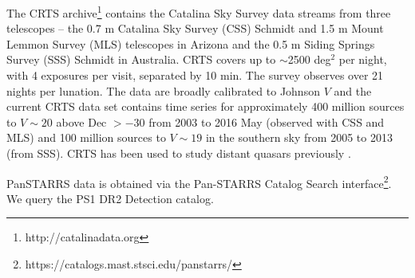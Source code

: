 \documentclass[fleqn,usenatbib]{mnras}
\begin{document}
The CRTS archive\footnote{http://catalinadata.org} contains the
Catalina Sky Survey data streams from three telescopes -- the 0.7 m
Catalina Sky Survey (CSS) Schmidt and 1.5 m Mount Lemmon Survey (MLS)
telescopes in Arizona and the 0.5 m Siding Springs Survey (SSS)
Schmidt in Australia. CRTS covers up to $\sim$2500 deg$^2$ per night,
with 4 exposures per visit, separated by 10 min. The survey observes
over 21 nights per lunation. The data are broadly calibrated to
Johnson $V$ \citep[see ][for details]{Drake2013} and the current CRTS
data set contains time series for approximately 400 million sources to
$V \sim 20$ above Dec $> -30$ from 2003 to 2016 May (observed with CSS
and MLS) and 100 million sources to $V \sim 19$ in the southern sky
from 2005 to 2013 (from SSS). CRTS has been used to study distant
quasars previously \citep{Graham2014, Graham2015, Graham2015Nature,
Graham2017, Graham2019b}.

PanSTARRS data is obtained via the Pan-STARRS Catalog Search
interface\footnote{https://catalogs.mast.stsci.edu/panstarrs/}.  We
query the PS1 DR2 Detection catalog.
\end{document}
